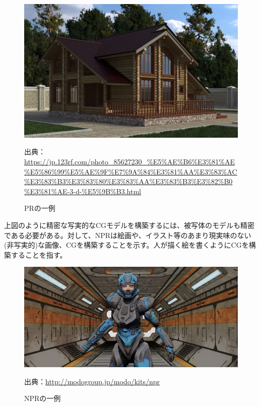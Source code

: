 \documentclass[dvipdfmx]{jsarticle}
\begin{document}
\begin{figure}[H]
  \centering
  \includegraphics[scale=0.4]{images/PR.jpg}
  \caption{PRの一例}
  出典：\url{https://jp.123rf.com/photo_85627230_%E5%AE%B6%E3%81%AE%E5%86%99%E5%AE%9F%E7%9A%84%E3%81%AA%E3%83%AC%E3%83%B3%E3%83%80%E3%83%AA%E3%83%B3%E3%82%B0%E3%81%AE-3-d-%E5%9B%B3.html}
\end{figure}
上図のように精密な写実的なCGモデルを構築するには、被写体のモデルも精密である必要がある。対して、NPRは絵画や、イラスト等のあまり現実味のない(非写実的)な画像、CGを構築することを示す。人が描く絵を書くようにCGを構築することを指す。
\begin{figure}[H]
  \centering
  \includegraphics[scale=0.4]{images/NPR.jpg}
  \caption{NPRの一例}
  出典：\url{http://modogroup.jp/modo/kits/npr}
\end{figure}
\end{document}
